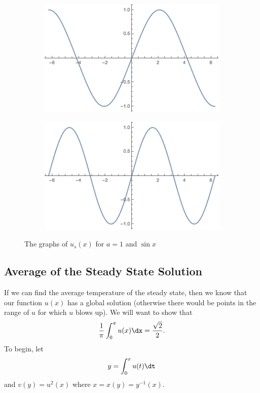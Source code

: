 \documentclass{hw}
\begin{document}
\begin{figure}[h]
\centering
\begin{subfigure}{0.45\textwidth}
\includegraphics[scale=0.5]{u_of_1_x}
\end{subfigure}
\hfill
\begin{subfigure}{0.45\textwidth}
\includegraphics[scale=0.5]{sinx}
\end{subfigure}
\caption{The graphs of $u_{s}(x)$ for $a=1$ and $\sin{x}$}
\end{figure}

\subsection{Average of the Steady State Solution}

If we can find the average temperature of the steady state, then we know that our function $u(x)$
has a global solution (otherwise there would be points in the range of $u$ for which $u$ blows up).
We will want to show that
\[
{1\over\pi}\int_{0}^{\pi}u(x)\dx={\sqrt{2}\over2}.
\]
To begin, let
\[
y=\int_{0}^{x}u(t)\dt
\]
and $v(y)=u^{2}(x)$ where $x=x(y)=y^{-1}(x)$. 
\end{document}
